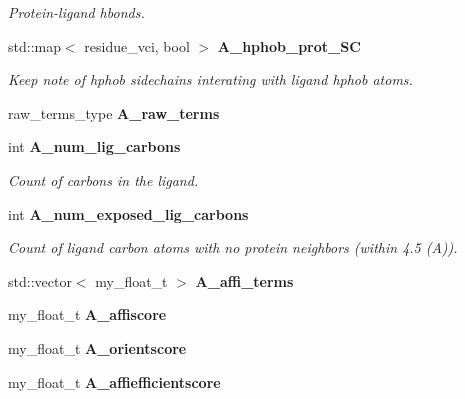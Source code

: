 \begin{CompactItemize}
\begin{CompactList}\small\item\em Protein-ligand hbonds. \item\end{CompactList}\item 
std::map$<$ residue\_\-vci, bool $>$ \bf{A\_\-hphob\_\-prot\_\-SC}\label{classASCbase_1_1ProtLigScore_d821097b1cb76b5bcc2e784d923c64f1}

\begin{CompactList}\small\item\em Keep note of hphob sidechains interating with ligand hphob atoms. \item\end{CompactList}\item 
raw\_\-terms\_\-type \textbf{A\_\-raw\_\-terms}\label{classASCbase_1_1ProtLigScore_6057aed97ad9d2f821e0243d0e991824}

\item 
int \bf{A\_\-num\_\-lig\_\-carbons}\label{classASCbase_1_1ProtLigScore_e8f1ebf48410e8bfa049bf7dad668351}

\begin{CompactList}\small\item\em Count of carbons in the ligand. \item\end{CompactList}\item 
int \bf{A\_\-num\_\-exposed\_\-lig\_\-carbons}\label{classASCbase_1_1ProtLigScore_6886d65b0975f0c237500478ba4a198c}

\begin{CompactList}\small\item\em Count of ligand carbon atoms with no protein neighbors (within 4.5 (A)). \item\end{CompactList}\item 
std::vector$<$ my\_\-float\_\-t $>$ \textbf{A\_\-affi\_\-terms}\label{classASCbase_1_1ProtLigScore_73c73cd82b0d7bfff4838314cd84ab0b}

\item 
my\_\-float\_\-t \textbf{A\_\-affiscore}\label{classASCbase_1_1ProtLigScore_7e1e577116eee25a76c19f55682c1558}

\item 
my\_\-float\_\-t \textbf{A\_\-orientscore}\label{classASCbase_1_1ProtLigScore_5535061a8d607e195cfc72d8836e5302}

\item 
my\_\-float\_\-t \textbf{A\_\-affiefficientscore}\label{classASCbase_1_1ProtLigScore_49bb696b0e08da39348198573860b0d7}


\end{CompactItemize}
